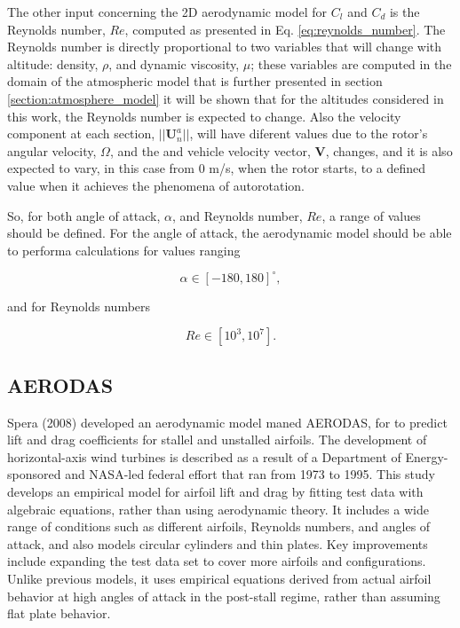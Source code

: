 The other input concerning the 2D aerodynamic model for $C_l$ and $C_d$ is the Reynolds number, $Re$, computed as presented in Eq. \ref{eq:reynolds_number}. The Reynolds number is directly proportional to two variables that will change with altitude: density, $\rho$, and dynamic viscosity, $\mu$; these variables are computed in the domain of the atmospheric model that is further presented in section \ref{section:atmosphere_model} it will be shown that for the altitudes considered in this work, the Reynolds number is expected to change. Also the velocity component at each section, $||\mathbf{U}^a_n||$, will have diferent values due to the rotor's angular velocity, $\Omega$, and the and vehicle velocity vector, $\mathbf{V}$, changes, and it is also expected to vary, in this case from 0 \unit{m/s}, when the rotor starts, to a defined value when it achieves the phenomena of autorotation.

So, for both angle of attack, $\alpha$, and Reynolds number, $Re$, a range of values should be defined. For the angle of attack, the aerodynamic model should be able to performa calculations for values ranging 

\begin{equation}
    \alpha \in [-180, 180] ^{\circ},
\end{equation}

and for Reynolds numbers

\begin{equation}
    Re \in [10^3, 10^7].
\end{equation}

\subsection{AERODAS}
\label{sec:aerodas}

Spera (2008) \cite{spera_models_2008} developed an aerodynamic model  maned AERODAS, for to predict lift and drag coefficients for stallel and unstalled airfoils. The development of horizontal-axis wind turbines is described as a result of a Department of Energy-sponsored and NASA-led federal effort that ran from 1973 to 1995. This study develops an empirical model for airfoil lift and drag by fitting test data with algebraic equations, rather than using aerodynamic theory. It includes a wide range of conditions such as different airfoils, Reynolds numbers, and angles of attack, and also models circular cylinders and thin plates. Key improvements include expanding the test data set to cover more airfoils and configurations. Unlike previous models, it uses empirical equations derived from actual airfoil behavior at high angles of attack in the post-stall regime, rather than assuming flat plate behavior.

